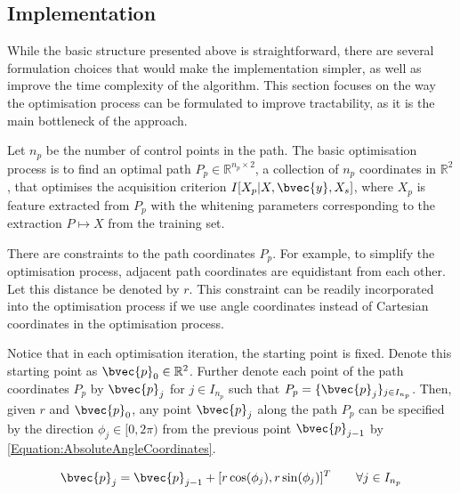 		\subsection{Implementation}

			While the basic structure presented above is straightforward, there are several formulation choices that would make the implementation simpler, as well as improve the time complexity of the algorithm. This section focuses on the way the optimisation process can be formulated to improve tractability, as it is the main bottleneck of the approach.
			
%			
%			
%			
	
			Let $n_{p}$ be the number of control points in the path. The basic optimisation process is to find an optimal path $P_{p} \in \mathbb{R}^{n_{p} \times 2}$, a collection of $n_{p}$ coordinates in $\mathbb{R}^{2}$, that optimises the acquisition criterion $I[X_{p} | X, \bvec{y}, X_{s}]$, where $X_{p}$ is feature extracted from $P_{p}$ with the whitening parameters corresponding to the extraction $P \mapsto X$ from the training set.
			
			There are constraints to the path coordinates $P_{p}$. For example, to simplify the optimisation process, adjacent path coordinates are equidistant from each other. Let this distance be denoted by $r$. This constraint can be readily incorporated into the optimisation process if we use angle coordinates instead of Cartesian coordinates in the optimisation process.
			
			Notice that in each optimisation iteration, the starting point is fixed. Denote this starting point as $\bvec{p}_{0} \in \mathbb{R}^{2}$. Further denote each point of the path coordinates $P_{p}$ by $\bvec{p}_{j}$ for $j \in I_{n_{p}}$ such that $P_{p} = \{\bvec{p}_{j}\}_{j \in I_{n_{p}}}$. Then, given $r$ and $\bvec{p}_{0}$, any point $\bvec{p}_{j}$ along the path $P_{p}$ can be specified by the direction $\phi_{j} \in [0, 2 \pi)$ from the previous point $\bvec{p}_{j - 1}$ by \eqref{Equation:AbsoluteAngleCoordinates}.
				
			\begin{equation}			
				\bvec{p}_{j} = \bvec{p}_{j - 1} + [r \cos(\phi_{j}), r \sin(\phi_{j})]^{T}	\qquad \forall j \in I_{n_{p}}			
			\label{Equation:AbsoluteAngleCoordinates}			
			\end{equation}
			
